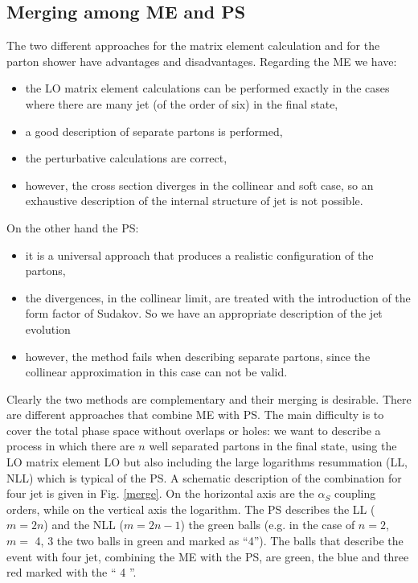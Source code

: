 \subsection*{Merging among ME and PS}
The two different approaches for the  matrix element calculation  and for the parton shower have advantages and disadvantages. Regarding the ME we have:
\begin{itemize}
\item the LO matrix element calculations  can be performed exactly in the cases where there are many jet (of the order of six) in the final state,
\item a good description of separate partons is performed,
\item the perturbative calculations are correct,
\item however, the cross section diverges in the collinear and soft case, so an exhaustive description of the internal structure of jet is not possible.
\end{itemize}
On the other hand the PS:
\begin{itemize}
\item it is a universal approach that produces a realistic configuration of the partons,
\item the divergences, in the collinear limit, are treated with the introduction of the form factor of Sudakov. So we have an appropriate description of the jet evolution
\item however, the method fails when describing separate partons, since the collinear approximation in this case can not be valid.
\end{itemize}
Clearly the two methods are complementary and their merging is desirable. 
There are different approaches that combine ME with PS. The main difficulty is to cover the total phase space without overlaps or holes: we want to describe a process in which there are $ n $ well separated partons in the final state, using the LO matrix element LO but  also including the  large logarithms resummation (LL, NLL) which is typical of the PS. A schematic description of the combination for four jet is given in Fig. \ref{merge}.
On the horizontal axis are the $ \alpha_S $ coupling orders, while on the vertical axis  the logarithm.
The PS describes the LL ($ m = 2n $) and the NLL ($ m = 2n-1 $) the green balls (e.g. in the case of $ n = 2 $, $ m = $ 4, 3 the two balls  in green and marked as ``4'').
The balls that describe the event with four jet, combining the ME with the PS, are  green, the blue  and  three red  marked with the `` 4 ''.
